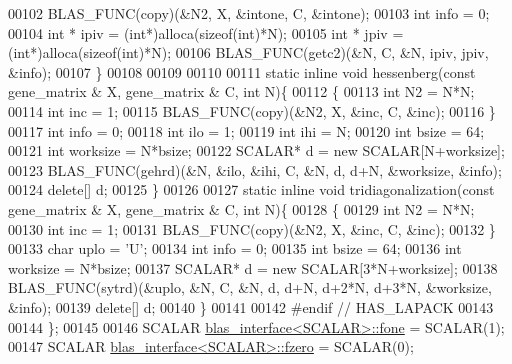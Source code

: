\begin{DoxyCode}
00102     BLAS\_FUNC(copy)(&N2, X, &intone, C, &intone);
00103     \textcolor{keywordtype}{int} info = 0;
00104     \textcolor{keywordtype}{int} * ipiv = (\textcolor{keywordtype}{int}*)alloca(\textcolor{keyword}{sizeof}(\textcolor{keywordtype}{int})*N);
00105     \textcolor{keywordtype}{int} * jpiv = (\textcolor{keywordtype}{int}*)alloca(\textcolor{keyword}{sizeof}(\textcolor{keywordtype}{int})*N);
00106     BLAS\_FUNC(getc2)(&N, C, &N, ipiv, jpiv, &info);
00107   \}
00108 
00109 
00110 
00111   \textcolor{keyword}{static} \textcolor{keyword}{inline} \textcolor{keywordtype}{void} hessenberg(\textcolor{keyword}{const} gene\_matrix & X, gene\_matrix & C, \textcolor{keywordtype}{int} N)\{
00112     \{
00113       \textcolor{keywordtype}{int} N2 = N*N;
00114       \textcolor{keywordtype}{int} inc = 1;
00115       BLAS\_FUNC(copy)(&N2, X, &inc, C, &inc);
00116     \}
00117     \textcolor{keywordtype}{int} info = 0;
00118     \textcolor{keywordtype}{int} ilo = 1;
00119     \textcolor{keywordtype}{int} ihi = N;
00120     \textcolor{keywordtype}{int} bsize = 64;
00121     \textcolor{keywordtype}{int} worksize = N*bsize;
00122     SCALAR* d = \textcolor{keyword}{new} SCALAR[N+worksize];
00123     BLAS\_FUNC(gehrd)(&N, &ilo, &ihi, C, &N, d, d+N, &worksize, &info);
00124     \textcolor{keyword}{delete}[] d;
00125   \}
00126 
00127   \textcolor{keyword}{static} \textcolor{keyword}{inline} \textcolor{keywordtype}{void} tridiagonalization(\textcolor{keyword}{const} gene\_matrix & X, gene\_matrix & C, \textcolor{keywordtype}{int} N)\{
00128     \{
00129       \textcolor{keywordtype}{int} N2 = N*N;
00130       \textcolor{keywordtype}{int} inc = 1;
00131       BLAS\_FUNC(copy)(&N2, X, &inc, C, &inc);
00132     \}
00133     \textcolor{keywordtype}{char} uplo = \textcolor{charliteral}{'U'};
00134     \textcolor{keywordtype}{int} info = 0;
00135     \textcolor{keywordtype}{int} bsize = 64;
00136     \textcolor{keywordtype}{int} worksize = N*bsize;
00137     SCALAR* d = \textcolor{keyword}{new} SCALAR[3*N+worksize];
00138     BLAS\_FUNC(sytrd)(&uplo, &N, C, &N, d, d+N, d+2*N, d+3*N, &worksize, &info);
00139     \textcolor{keyword}{delete}[] d;
00140   \}
00141   
00142 \textcolor{preprocessor}{  #endif // HAS\_LAPACK}
00143 
00144 \};
00145 
00146 SCALAR \hyperlink{classblas__interface}{blas\_interface<SCALAR>::fone} = SCALAR(1);
00147 SCALAR \hyperlink{classblas__interface}{blas\_interface<SCALAR>::fzero} = SCALAR(0);
\end{DoxyCode}
